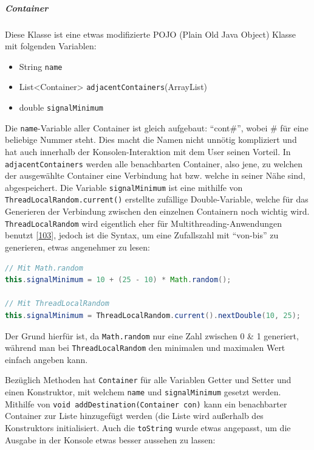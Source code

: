 \documentclass[
    headings=optiontotocandhead,%
    twoside,
    numbers=noenddot,%
    12pt, %
    titlepage, %
    parskip=full, %
    listof=leveldown, 
    numbers=noenddot, %
    a4paper,DIV=14,
    BCOR=15mm,
]{scrbook}
\newcommand{\passthrough}[1]{#1}
\providecommand{\tightlist}{%
  \setlength{\itemsep}{0pt}\setlength{\parskip}{0pt}}
\begin{document}
\hypertarget{container-1}{%
\subparagraph{Container}\label{container-1}}

Diese Klasse ist eine etwas modifizierte POJO (Plain Old Java Object)
Klasse mit folgenden Variablen:

\begin{itemize}
\tightlist
\item
  String \passthrough{\lstinline!name!}
\item
  List\textless Container\textgreater{}
  \passthrough{\lstinline!adjacentContainers!}(ArrayList)
\item
  double \passthrough{\lstinline!signalMinimum!}
\end{itemize}

Die \passthrough{\lstinline!name!}-Variable aller Container ist gleich
aufgebaut: ``cont\#'', wobei \# für eine beliebige Nummer steht. Dies
macht die Namen nicht unnötig kompliziert und hat auch innerhalb der
Konsolen-Interaktion mit dem User seinen Vorteil. In
\passthrough{\lstinline!adjacentContainers!} werden alle benachbarten
Container, also jene, zu welchen der ausgewählte Container eine
Verbindung hat bzw. welche in seiner Nähe sind, abgespeichert. Die
Variable \passthrough{\lstinline!signalMinimum!} ist eine mithilfe von
\passthrough{\lstinline!ThreadLocalRandom.current()!} erstellte
zufällige Double-Variable, welche für das Generieren der Verbindung
zwischen den einzelnen Containern noch wichtig wird.
\passthrough{\lstinline!ThreadLocalRandom!} wird eigentlich eher für
Multithreading-Anwendungen benutzt
{[}\protect\hyperlink{ref-Baeldung-JavaRandom}{103}{]}, jedoch ist die
Syntax, um eine Zufallszahl mit ``von-bis'' zu generieren, etwas
angenehmer zu lesen:

\begin{lstlisting}[language=Java, caption={Zufällige Nummer mit .math und ThreadLocalRandom}]
// Mit Math.random
this.signalMinimum = 10 + (25 - 10) * Math.random();

// Mit ThreadLocalRandom
this.signalMinimum = ThreadLocalRandom.current().nextDouble(10, 25);
\end{lstlisting}

Der Grund hierfür ist, da \passthrough{\lstinline!Math.random!} nur eine
Zahl zwischen 0 \& 1 generiert, während man bei
\passthrough{\lstinline!ThreadLocalRandom!} den minimalen und maximalen
Wert einfach angeben kann.

Bezüglich Methoden hat \passthrough{\lstinline!Container!} für alle
Variablen Getter und Setter und einen Konstruktor, mit welchem
\passthrough{\lstinline!name!} und
\passthrough{\lstinline!signalMinimum!} gesetzt werden. Mithilfe von
\passthrough{\lstinline!void addDestination(Container con)!} kann ein
benachbarter Container zur Liste hinzugefügt werden (die Liste wird
außerhalb des Konstruktors initialisiert. Auch die
\passthrough{\lstinline!toString!} wurde etwas angepasst, um die Ausgabe
in der Konsole etwas besser aussehen zu lassen:
\end{document}
